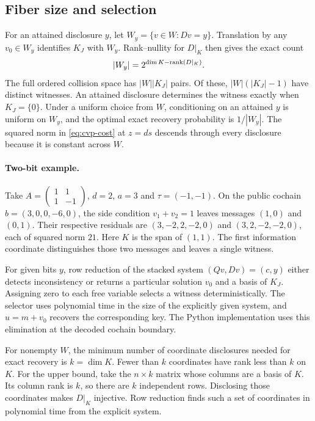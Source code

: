 \subsection{Fiber size and selection}

For an attained disclosure \(y\), let \(W_y=\{v\in W:Dv=y\}\). Translation
by any \(v_0\in W_y\) identifies \(K_J\) with \(W_y\). Rank--nullity for
\(D|_K\) then gives the exact count
\[
  |W_y|=2^{\dim K-\operatorname{rank}(D|_K)} .
\]
The full ordered collision space has \(|W||K_J|\) pairs. Of these,
\(|W|(|K_J|-1)\) have distinct witnesses. An attained disclosure
determines the witness exactly when \(K_J=\{0\}\). Under a uniform
choice from \(W\), conditioning on an attained \(y\) is uniform on
\(W_y\), and the optimal exact recovery probability is \(1/|W_y|\).
The squared norm in \eqref{eq:cvp-cost} at \(z=ds\) descends through
every disclosure because it is constant across \(W\).

\paragraph{Two-bit example.}
Take \(A=\left(\begin{smallmatrix}1&1\\1&-1\end{smallmatrix}\right)\),
\(d=2\), \(a=3\) and \(\tau=(-1,-1)\). On the public cochain
\(b=(3,0,0,-6,0)\), the side condition \(v_1+v_2=1\) leaves messages
\((1,0)\) and \((0,1)\). Their respective residuals are
\((3,-2,2,-2,0)\) and \((3,2,-2,-2,0)\), each of squared norm \(21\).
Here \(K\) is the span of \((1,1)\). The first information coordinate
distinguishes those two messages and leaves a single witness.

For given bits \(y\), row reduction of the stacked system
\((Qv,Dv)=(c,y)\) either detects inconsistency or returns a particular
solution \(v_0\) and a basis of \(K_J\). Assigning zero to each free
variable selects a witness deterministically. The selector uses
polynomial time in the size of the explicitly given system, and
\(u=m+v_0\) recovers the corresponding key. The Python implementation
uses this elimination at the decoded cochain boundary.

For nonempty \(W\), the minimum number of coordinate disclosures needed
for exact recovery is \(k=\dim K\). Fewer than \(k\) coordinates have
rank less than \(k\) on \(K\). For the upper bound, take the \(n\times k\)
matrix whose columns are a basis of \(K\). Its column rank is \(k\), so
there are \(k\) independent rows. Disclosing those coordinates makes
\(D|_K\) injective. Row reduction finds such a set of coordinates in
polynomial time from the explicit system.

